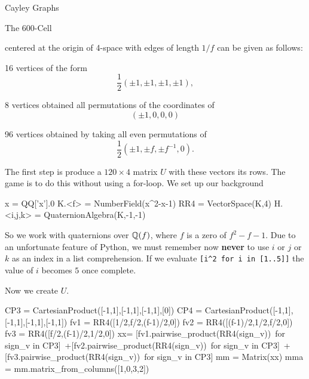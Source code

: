 \begin{chap}{Cayley Graphs}
\begin{sect}{The 600-Cell}
\begin{para}
centered at the origin of 4-space with edges of length $1/f$ 
can be given as follows: 
\begin{enumerate}
    \begin{listitem}
    16 vertices of the form
    \[
        \frac12(\pm1,\pm1,\pm1,\pm1),
    \]
    \end{listitem}
    \begin{listitem}
    8 vertices obtained all permutations of the coordinates of
    \[
        (\pm1,0,0,0)
    \]
    \end{listitem}
    \begin{listitem}
    96 vertices obtained by taking all even permutations of
    \[
        \frac12\left(\pm1,\pm f,\pm f^{-1},0\right).
    \]
    \end{listitem}
\end{enumerate}  
\end{para}
%
\begin{para}
The first step is produce a $120\times4$ matrix $U$ with these vectors
its rows. The game is to do this without using a for-loop.
We set up our background
\end{para}
%
\begin{sagecode}
\begin{sageinput}
x = QQ['x'].0
K.<f> = NumberField(x^2-x-1)
RR4 = VectorSpace(K,4) 
H.<i,j,k> = QuaternionAlgebra(K,-1,-1)
\end{sageinput}
\end{sagecode}
%
\begin{para}
So we work with quaternions over ${\mathbb Q}(f)$, where $f$ is a zero of $f^2-f-1$.
Due to an unfortunate feature of Python, we must remember now \textbf{never}
to use $i$ or $j$ or $k$ as an index in a list comprehension.  If we evaluate 
\verb|[i^2 for i in [1..5]]| the value of $i$ becomes $5$ once complete.
\end{para}
%
\begin{para}
Now we create $U$. 
\end{para}
%
\begin{sagecode}
\begin{sageinput}
CP3 = CartesianProduct([-1,1],[-1,1],[-1,1],[0])
CP4 = CartesianProduct([-1,1],[-1,1],[-1,1],[-1,1])
fv1 = RR4([1/2,f/2,(f-1)/2,0])
fv2 = RR4([(f-1)/2,1/2,f/2,0])
fv3 = RR4([f/2,(f-1)/2,1/2,0])
xx= [fv1.pairwise_product(RR4(sign_v))\
    for sign_v in CP3]\
    +[fv2.pairwise_product(RR4(sign_v))\
    for sign_v in CP3]\
    +[fv3.pairwise_product(RR4(sign_v))\
    for sign_v in CP3]
mm = Matrix(xx)
mma = mm.matrix_from_columns([1,0,3,2])

\end{sageinput}
\end{sagecode}
\end{sect}
\end{chap}
